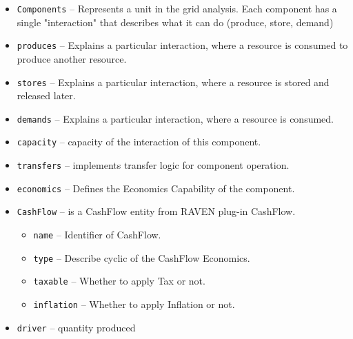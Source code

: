   \begin{itemize}
    \item \texttt{Components} -- Represents a unit in the grid analysis. Each component has a single "interaction" that
    describes what it can do (produce, store, demand)
    \item \texttt{produces} -- Explains a particular interaction, where a resource is consumed to produce another resource.
    \item \texttt{stores} -- Explains a particular interaction, where a resource is stored and released later.
    \item \texttt{demands} -- Explains a particular interaction, where a resource is consumed.
    \item \texttt{capacity} -- capacity of the interaction of this component.
    \item \texttt{transfers} -- implements transfer logic for component operation.
    \item \texttt{economics} -- Defines the Economics Capability of the component.
    \item \texttt{CashFlow} -- is a CashFlow entity from RAVEN plug-in CashFlow.
    \begin{itemize}
    \item \texttt{name} -- Identifier of CashFlow.
    \item \texttt{type} -- Describe cyclic of the CashFlow Economics.
    \item \texttt{taxable} -- Whether to apply Tax or not.
    \item \texttt{inflation} -- Whether to apply Inflation or not.
    \end{itemize}  
    \item \texttt{driver} -- quantity produced
  \end{itemize}




